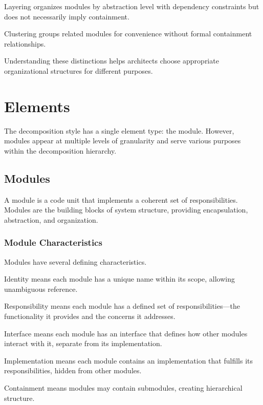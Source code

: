 \documentclass[11pt]{article}
\begin{document}
Layering organizes modules by abstraction level with dependency constraints but does not necessarily imply containment.

Clustering groups related modules for convenience without formal containment relationships.

Understanding these distinctions helps architects choose appropriate organizational structures for different purposes.

\section{Elements}

The decomposition style has a single element type: the module. However, modules appear at multiple levels of granularity and serve various purposes within the decomposition hierarchy.

\subsection{Modules}

A module is a code unit that implements a coherent set of responsibilities. Modules are the building blocks of system structure, providing encapsulation, abstraction, and organization.

\subsubsection{Module Characteristics}

Modules have several defining characteristics.

Identity means each module has a unique name within its scope, allowing unambiguous reference.

Responsibility means each module has a defined set of responsibilities---the functionality it provides and the concerns it addresses.

Interface means each module has an interface that defines how other modules interact with it, separate from its implementation.

Implementation means each module contains an implementation that fulfills its responsibilities, hidden from other modules.

Containment means modules may contain submodules, creating hierarchical structure.
\end{document}
